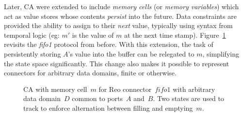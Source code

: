 Later, CA were extended to include \textit{memory cells} (or \textit{memory variables}) which act as value stores whose contents \textit{persist} into the future. Data constraints are provided the ability to assign to their \textit{next} value, typically using syntax from temporal logic (eg: $m'$ is the value of $m$ at the next time stamp). Figure~\ref{fig:fifo1_ca_mem} revisits the \textit{fifo1} protocol from before. With this extension, the task of persistently storing $A$'s value into the buffer can be relegated to $m$, simplifying the state space significantly. This change also makes it possible to represent connectors for arbitrary data domains, finite or otherwise.



\begin{figure}[ht]
	\centering
	\caption[CA with memory for fifo1 connector.]{CA with memory cell~$m$ for Reo connector~$fifo1$ with arbitrary data domain~$D$ common to ports~$A$ and~$B$. Two states are used to track to enforce alternation between filling and emptying~$m$.}
	\label{fig:fifo1_ca_mem}
\end{figure}


